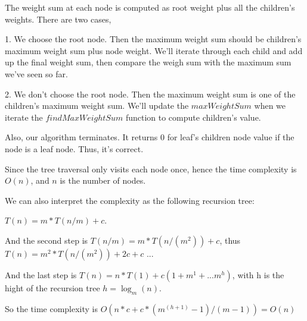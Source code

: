 The weight sum at each node is computed as root weight plus all the children's weights. There are two cases, 

1. We choose the root node. Then the maximum weight sum should be children's maximum weight sum plus node weight. We'll iterate through each child and add up the final weight sum, then compare the weigh sum with the maximum sum we've seen so far.

2. We don't choose the root node. Then the maximum weight sum is one of the children's maximum weight sum. We'll update the $maxWeightSum$ when we iterate the $findMaxWeightSum$ function to compute children's value.

Also, our algorithm terminates. It returns 0 for leaf's children node value if the node is a leaf node. Thus, it's correct.


Since the tree traversal only visits each node once, hence the time complexity is $O(n)$, and $n$ is the number of nodes.

We can also interpret the complexity as the following recursion tree: 

$T(n) = m*T(n/m)+ c$.

And the second step is $T(n/m) = m*T(n/(m^2)) + c$, thus $T(n) = m^2*T(n/(m^2)) + 2c + c$ ...

And the last step is $T(n) = n*T(1) + c(1+m^1+...m^h)$, with h is the hight of the recursion tree $h = \log_m(n)$.

So the time complexity is $O(n*c + c*(m^(h+1)-1)/(m-1)) = O(n)$


